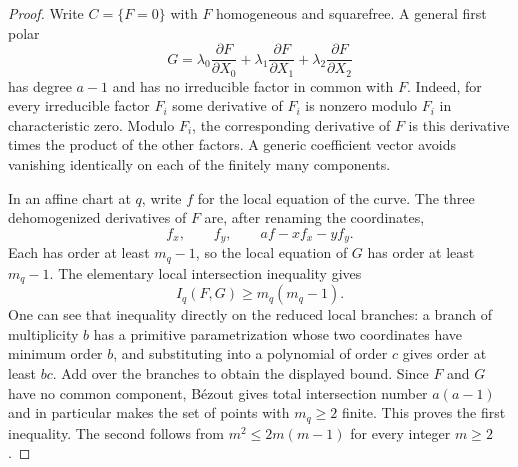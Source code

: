 \begin{proof}
Write $C=\{F=0\}$ with $F$ homogeneous and squarefree.  A general first polar
\[
 G=\lambda_0\frac{\partial F}{\partial X_0}
   +\lambda_1\frac{\partial F}{\partial X_1}
   +\lambda_2\frac{\partial F}{\partial X_2}
\]
has degree $a-1$ and has no irreducible factor in common with $F$. Indeed, for every irreducible factor $F_i$ some derivative of $F_i$ is nonzero modulo $F_i$ in characteristic zero.  Modulo $F_i$, the corresponding derivative of $F$ is this derivative times the product of the other factors.  A generic coefficient vector avoids vanishing identically on each of the finitely many components.

In an affine chart at $q$, write $f$ for the local equation of the curve.  The three dehomogenized derivatives of $F$ are, after renaming the coordinates,
\[
 f_x,\qquad f_y,\qquad af-xf_x-yf_y.
\]
Each has order at least $m_q-1$, so the local equation of $G$ has order at least $m_q-1$.  The elementary local intersection inequality gives
\[
 I_q(F,G)\ge m_q(m_q-1).
\]
One can see that inequality directly on the reduced local branches: a branch of multiplicity $b$ has a primitive parametrization whose two coordinates have minimum order $b$, and substituting into a polynomial of order $c$ gives order at least $bc$.  Add over the branches to obtain the displayed bound.  Since $F$ and $G$ have no common component, B\'ezout gives total intersection number $a(a-1)$ and in particular makes the set of points with $m_q\ge2$ finite. This proves the first inequality.  The second follows from $m^2\le2m(m-1)$ for every integer $m\ge2$.
\end{proof}
